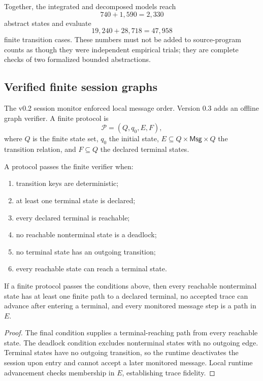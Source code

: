 Together, the integrated and decomposed models reach
\[
740+1{,}590=2{,}330
\]
abstract states and evaluate
\[
19{,}240+28{,}718=47{,}958
\]
finite transition cases.  These numbers must not be added to source-program counts as though they were independent empirical trials; they are complete checks of two formalized bounded abstractions.

\subsection{Verified finite session graphs}

The v0.2 session monitor enforced local message order.  Version 0.3 adds an offline graph verifier.  A finite protocol is
\[
\mathcal P=(Q,q_0,E,F),
\]
where \(Q\) is the finite state set, \(q_0\) the initial state, \(E\subseteq Q\times\mathsf{Msg}\times Q\) the transition relation, and \(F\subseteq Q\) the declared terminal states.

A protocol passes the finite verifier when:
\begin{enumerate}[label=(\roman*),leftmargin=1.7em]
  \item transition keys are deterministic;
  \item at least one terminal state is declared;
  \item every declared terminal is reachable;
  \item no reachable nonterminal state is a deadlock;
  \item no terminal state has an outgoing transition;
  \item every reachable state can reach a terminal state.
\end{enumerate}

\begin{theorem}
\label{thm:finite-protocol-completion}
If a finite protocol passes the conditions above, then every reachable nonterminal state has at least one finite path to a declared terminal, no accepted trace can advance after entering a terminal, and every monitored message step is a path in \(E\).
\end{theorem}

\begin{proof}
The final condition supplies a terminal-reaching path from every reachable state.  The deadlock condition excludes nonterminal states with no outgoing edge.  Terminal states have no outgoing transition, so the runtime deactivates the session upon entry and cannot accept a later monitored message.  Local runtime advancement checks membership in \(E\), establishing trace fidelity.  \qedhere
\end{proof}

